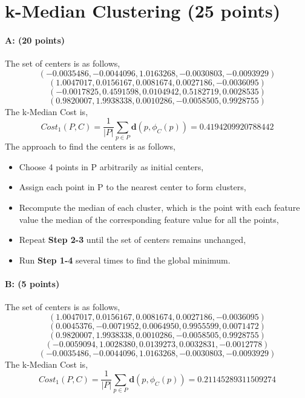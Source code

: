 \documentclass[11pt]{article}
\begin{document}
\section{k-Median Clustering (25 points)}

\paragraph{A: (20 points)}
The set of centers is as follows,
$$(-0.0035486, -0.0044096, 1.0163268, -0.0030803, -0.0093929)$$
$$(1.0047017, 0.0156167, 0.0081674, 0.0027186, -0.0036095)$$
$$(-0.0017825, 0.4591598, 0.0104942, 0.5182719, 0.0028535)$$
$$(0.9820007, 1.9938338, 0.0010286, -0.0058505, 0.9928755)$$
The k-Median Cost is,
$$Cost_1(P, C)=\frac{1}{|P|}\sum_{p\in P}\mathbf{d}(p, \phi_C(p))=0.4194209920788442$$
The approach to find the centers is as follows,
\begin{itemize}
\item Choose 4 points in P arbitrarily as initial centers,
\item Assign each point in P to the nearest center to form clusters,
\item Recompute the median of each cluster, which is the point with each feature value the median of the corresponding feature value for all the points,
\item Repeat \textbf{Step 2-3} until the set of centers remains unchanged,
\item Run \textbf{Step 1-4} several times to find the global minimum. 
\end{itemize}

\paragraph{B: (5 points)}
The set of centers is as follows,
$$(1.0047017, 0.0156167, 0.0081674, 0.0027186, -0.0036095)$$
$$(0.0045376, -0.0071952, 0.0064950, 0.9955599, 0.0071472)$$
$$(0.9820007, 1.9938338, 0.0010286, -0.0058505, 0.9928755)$$
$$(-0.0059094, 1.0028380, 0.0139273, 0.0032831, -0.0012778)$$
$$(-0.0035486, -0.0044096, 1.0163268, -0.0030803, -0.0093929)$$
The k-Median Cost is,
$$Cost_1(P, C)=\frac{1}{|P|}\sum_{p\in P}\mathbf{d}(p, \phi_C(p))=0.21145289311509274$$

\newpage
\end{document}
